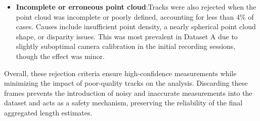 \documentclass[utf8]{FrontiersinHarvard} %
\begin{document}
\begin{itemize}
    \item \textbf{Incomplete or erroneous point cloud}:Tracks were also rejected when the point cloud was incomplete or poorly defined, accounting for less than 4\% of cases. Causes include insufficient point density, a nearly spherical point cloud shape, or disparity issues. This was most prevalent in Dataset A due to slightly suboptimal camera calibration in the initial recording sessions, though the effect was minor.
 
    
\end{itemize}

Overall, these rejection criteria ensure high-confidence measurements while minimizing the impact of poor-quality tracks on the analysis. Discarding these frames prevents the introduction of noisy and inaccurate measurements into the dataset and acts as a safety mechanism, preserving the reliability of the final aggregated length estimates. 


\end{document}
